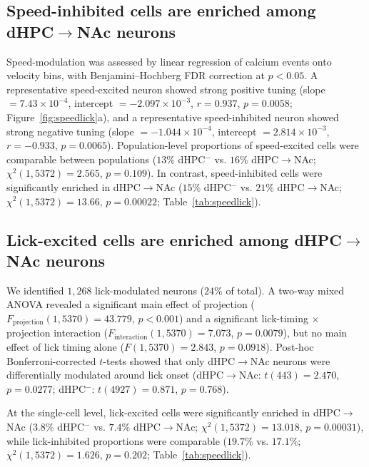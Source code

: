 \documentclass[11pt]{article}
\begin{document}
\subsection{Speed-inhibited cells are enriched among dHPC$\to$NAc neurons}

Speed-modulation was assessed by linear regression of calcium events onto velocity bins, with Benjamini--Hochberg FDR correction at $p<0.05$. A representative speed-excited neuron showed strong positive tuning (slope $= 7.43\times 10^{-4}$, intercept $= -2.097\times 10^{-3}$, $r=0.937$, $p=0.0058$; Figure~\ref{fig:speedlick}a), and a representative speed-inhibited neuron showed strong negative tuning (slope $= -1.044\times 10^{-4}$, intercept $= 2.814\times 10^{-3}$, $r=-0.933$, $p=0.0065$). Population-level proportions of speed-excited cells were comparable between populations ($13\%$ dHPC$^-$ vs. $16\%$ dHPC$\to$NAc; $\chi^2(1,5372) = 2.565$, $p=0.109$). In contrast, speed-inhibited cells were significantly enriched in dHPC$\to$NAc ($15\%$ dHPC$^-$ vs. $21\%$ dHPC$\to$NAc; $\chi^2(1,5372) = 13.66$, $p=0.00022$; Table~\ref{tab:speedlick}).

\subsection{Lick-excited cells are enriched among dHPC$\to$NAc neurons}

We identified $1{,}268$ lick-modulated neurons ($24\%$ of total). A two-way mixed ANOVA revealed a significant main effect of projection ($F_{\text{projection}}(1,5370) = 43.779$, $p<0.001$) and a significant lick-timing $\times$ projection interaction ($F_{\text{interaction}}(1,5370) = 7.073$, $p=0.0079$), but no main effect of lick timing alone ($F(1,5370) = 2.843$, $p=0.0918$). Post-hoc Bonferroni-corrected $t$-tests showed that only dHPC$\to$NAc neurons were differentially modulated around lick onset (dHPC$\to$NAc: $t(443) = 2.470$, $p=0.0277$; dHPC$^-$: $t(4927) = 0.871$, $p=0.768$).

At the single-cell level, lick-excited cells were significantly enriched in dHPC$\to$NAc ($3.8\%$ dHPC$^-$ vs. $7.4\%$ dHPC$\to$NAc; $\chi^2(1,5372) = 13.018$, $p=0.00031$), while lick-inhibited proportions were comparable ($19.7\%$ vs. $17.1\%$; $\chi^2(1,5372) = 1.626$, $p=0.202$; Table~\ref{tab:speedlick}).
\end{document}
